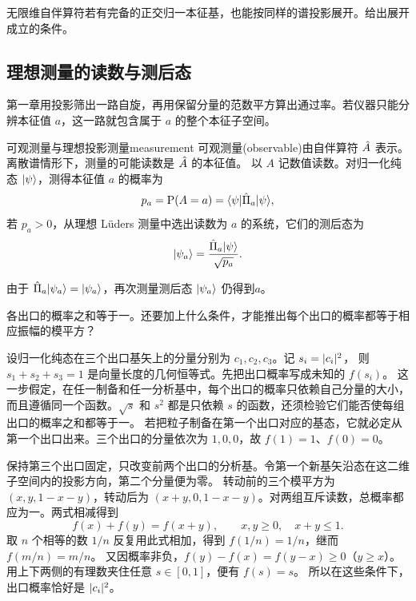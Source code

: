 无限维自伴算符若有完备的正交归一本征基，也能按同样的谱投影展开。给出展开成立的条件。

\subsection{理想测量的读数与测后态}

第一章用投影筛出一路自旋，再用保留分量的范数平方算出通过率。若仪器只能分辨本征值 $a$，这一路就包含属于 $a$ 的整个本征子空间。

\begin{postulate}{可观测量与理想投影测量}{measurement}
    可观测量(observable)由自伴算符 $\hat{A}$ 表示。离散谱情形下，测量的可能读数是 $\hat{A}$ 的本征值。
    以 $A$ 记数值读数。对归一化纯态 $\lvert\psi\rangle$，测得本征值 $a$ 的概率为
    \begin{equation}
        p_a = \operatorname{P}(A = a) = \langle\psi\vert\hat{\Pi}_a\vert\psi\rangle,
    \end{equation}
    若 $p_a > 0$，从理想 Lüders 测量中选出读数为 $a$ 的系统，它们的测后态为
    \begin{equation}
        \lvert\psi_a\rangle = \frac{\hat{\Pi}_a\lvert\psi\rangle}{\sqrt{p_a}}.
        \label{eq:luders-update}
    \end{equation}
\end{postulate}

\begin{corollary}
    由于 $\hat{\Pi}_a\lvert\psi_a\rangle = \lvert\psi_a\rangle$，再次测量测后态 $\lvert\psi_a\rangle$ 仍得到$a$。
\end{corollary}

\label{ss:qm-born-consistency}
各出口的概率之和等于一。还要加上什么条件，才能推出每个出口的概率都等于相应振幅的模平方？

设归一化纯态在三个出口基矢上的分量分别为 $c_1,c_2,c_3$。记 $s_i = \lvert c_i\rvert^2$，
则 $s_1 + s_2 + s_3 = 1$ 是向量长度的几何恒等式。先把出口概率写成未知的 $f(s_i)$。
这一步假定，在任一制备和任一分析基中，每个出口的概率只依赖自己分量的大小，而且遵循同一个函数。$\sqrt{s}$ 和 $s^2$ 都是只依赖 $s$ 的函数，还须检验它们能否使每组出口的概率之和都等于一。
若把粒子制备在第一个出口对应的基态，它就必定从第一个出口出来。三个出口的分量依次为 $1,0,0$，故 $f(1) = 1$、$f(0) = 0$。

保持第三个出口固定，只改变前两个出口的分析基。令第一个新基矢沿态在这二维子空间内的投影方向，第二个分量便为零。
转动前的三个模平方为 $(x,y,1 - x - y)$，转动后为 $(x + y,0,1 - x - y)$。对两组互斥读数，总概率都应为一。两式相减得到
\[
    f(x) + f(y) = f(x + y),\qquad x,y \geq 0,\quad x + y \leq 1 .
\]
取 $n$ 个相等的数 $1/n$ 反复用此式相加，得到 $f(1/n) = 1/n$，继而 $f(m/n) = m/n$。
又因概率非负，$f(y) - f(x) = f(y - x) \geq 0$（$y \geq x$）。用上下两侧的有理数夹住任意 $s \in [0,1]$，便有 $f(s) = s$。
所以在这些条件下，出口概率恰好是 $\lvert c_i\rvert^2$。

